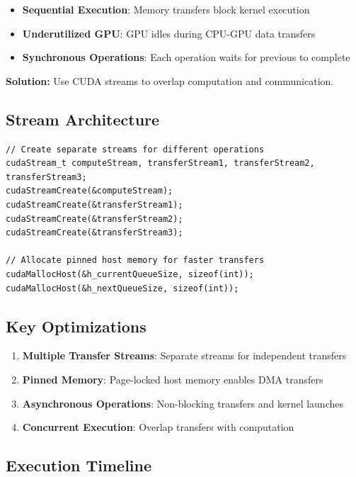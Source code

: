 \documentclass[11pt,a4paper]{article}
\begin{document}
\begin{itemize}
    \item \textbf{Sequential Execution}: Memory transfers block kernel execution
    \item \textbf{Underutilized GPU}: GPU idles during CPU-GPU data transfers
    \item \textbf{Synchronous Operations}: Each operation waits for previous to complete
\end{itemize}

\textbf{Solution:} Use CUDA streams to overlap computation and communication.

\subsection{Stream Architecture}

\begin{lstlisting}[caption={Stream Creation and Configuration}]
// Create separate streams for different operations
cudaStream_t computeStream, transferStream1, transferStream2, transferStream3;
cudaStreamCreate(&computeStream);
cudaStreamCreate(&transferStream1);
cudaStreamCreate(&transferStream2);
cudaStreamCreate(&transferStream3);

// Allocate pinned host memory for faster transfers
cudaMallocHost(&h_currentQueueSize, sizeof(int));
cudaMallocHost(&h_nextQueueSize, sizeof(int));
\end{lstlisting}

\subsection{Key Optimizations}

\begin{enumerate}
    \item \textbf{Multiple Transfer Streams}: Separate streams for independent transfers
    \item \textbf{Pinned Memory}: Page-locked host memory enables DMA transfers
    \item \textbf{Asynchronous Operations}: Non-blocking transfers and kernel launches
    \item \textbf{Concurrent Execution}: Overlap transfers with computation
\end{enumerate}

\subsection{Execution Timeline}
\end{document}
